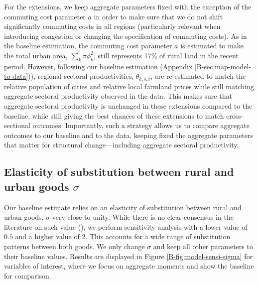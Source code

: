 \documentclass[11pt]{report}
\begin{document}
For the extensions, we keep aggregate parameters fixed with the exception of the commuting cost parameter $a$ in order to make sure that we do not shift significantly commuting costs in all regions (particularly relevant when introducing congestion or changing the specification of commuting costs). As in the baseline estimation, the commuting cost parameter $a$ is estimated to make the total urban area, $\sum_k\pi\phi_k^2 $, still represents 17\% of rural land in the recent period. However, following our baseline estimation (Appendix \ref{B-sec:map-model-to-data})), regional sectoral productivities, $\theta_{k,s,t}$, are re-estimated to match the relative population of cities and relative local farmland prices while still matching aggregate sectoral productivity observed in the data. This makes sure that aggregate sectoral productivity is unchanged in these extensions compared to the baseline, while still giving the best chances of these extensions to match cross-sectional outcomes. Importantly, such a strategy allows us to compare aggregate outcomes to our baseline and to the data, keeping fixed the aggregate parameters that matter for structural change---including aggregate sectoral productivity. 




\subsection{Elasticity of substitution between rural and urban goods $\sigma$}\label{B-sec:sigma}

Our baseline estimate relies on an elasticity of substitution between rural and urban goods, $\sigma$ very close to unity. While there is no clear consensus in the literature on such value (\cite{storesletten2019business}), we perform sensitivity analysis with a lower value of $0.5$ and a higher value of $2$. This accounts for a wide range of substitution patterns between both goods. We only change $\sigma$ and keep all other parameters to their baseline values. Results are displayed in Figure \ref{B-fig:model-sensi-sigma} for variables of interest, where we focus on aggregate moments and show the baseline for comparison.
\end{document}
